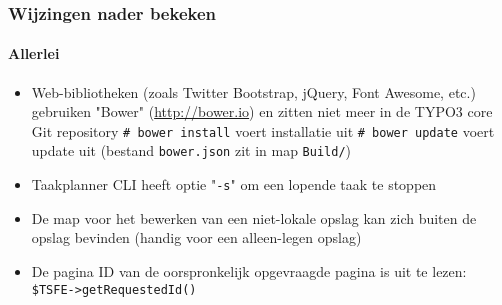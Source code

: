 \begin{frame}[fragile]
	\frametitle{Wijzingen nader bekeken}
	\framesubtitle{Allerlei}

	\begin{itemize}

		\item Web-bibliotheken (zoals Twitter Bootstrap, jQuery, Font Awesome, etc.) gebruiken
			"Bower" (\url{http://bower.io}) en zitten niet meer in de TYPO3 core Git repository
			\newline
			\small
				\texttt{\# bower install}	\tabto{3.4cm}voert installatie uit\newline
				\texttt{\# bower update}		\tabto{3.4cm}voert update uit\newline
			\normalsize
			(bestand \texttt{bower.json} zit in map \texttt{Build/})

		\item Taakplanner CLI heeft optie "\texttt{-s}" om een lopende taak te stoppen

		\item De map voor het bewerken van een niet-lokale opslag kan zich buiten de opslag bevinden
			(handig voor een alleen-legen opslag)

		\item De pagina ID van de oorspronkelijk opgevraagde pagina is uit te lezen:
			\texttt{\$TSFE->getRequestedId()}

	\end{itemize}

\end{frame}

